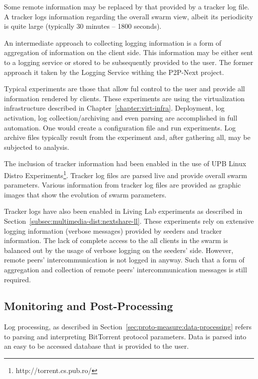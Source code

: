 Some remote information may be replaced by that provided by a tracker log
file. A tracker logs information regarding the overall swarm view, albeit its
periodicity is quite large (typically 30 minutes -- 1800 seconds).

An intermediate approach to collecting logging information is a form of
aggregation of information on the client side. This information may be either
sent to a logging service or stored to be subsequently provided to the user.
The former approach it taken by the Logging Service withing the P2P-Next
project.

Typical experiments are those that allow ful control to the user and provide
all information rendered by clients. These experiments are using the
virtualization infrastructure described in Chapter~\ref{chapter:virt-infra}.
Deployment, log activation, log collection/archiving and even parsing are
accomplished in full automation. One would create a configuration file and run
experiments. Log archive files typically result from the experiment and, after
gathering all, may be subjected to analysis.

The inclusion of tracker information had been enabled in the use of UPB Linux
Distro Experiments\footnote{http://torrent.cs.pub.ro/}. Tracker log files are
parsed live and provide overall swarm parameters. Various information from
tracker log files are provided as graphic images that show the evolution of
swarm parameters.

Tracker logs have also been enabled in Living Lab experiments as described in
Section~\ref{subsec:multimedia-dist:nextshare-ll}. These experiments rely on
extensive logging information (verbose messages) provided by seeders and
tracker information. The lack of complete access to the all clients in the
swarm is balanced out by the usage of verbose logging on the seeders' side.
However, remote peers' intercommunication is not logged in anyway. Such that a
form of aggregation and collection of remote peers' intercommunication
messages is still required.

\subsection{Monitoring and Post-Processing}

Log processing, as described in
Section~\ref{sec:proto-measure:data-processing} refers to parsing and
interpreting BitTorrent protocol parameters. Data is parsed into an easy to be
accessed database that is provided to the user.

